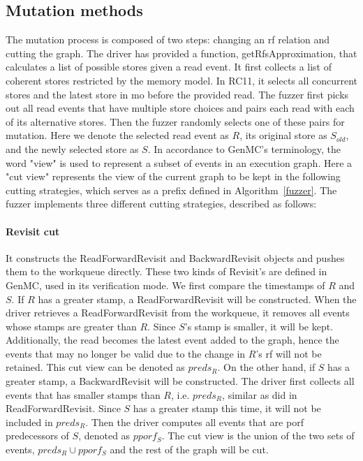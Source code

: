 \subsection{Mutation methods}

The mutation process is composed of two steps: changing an rf relation and cutting the graph. The driver has provided a function, getRfsApproximation, that calculates a list of possible stores given a read event. It first collects a list of coherent stores restricted by the memory model. In RC11, it selects all concurrent stores and the latest store in mo before the provided read. The fuzzer first picks out all read events that have multiple store choices and pairs each read with each of its alternative stores. Then the fuzzer randomly selects one of these pairs for mutation. Here we denote the selected read event as $R$, its original store as $S_{old}$, and the newly selected store as $S$. In accordance to GenMC's terminology, the word "view" is used to represent a subset of events in an execution graph. Here a "cut view" represents the view of the current graph to be kept in the following cutting strategies, which serves as a prefix defined in Algorithm~\ref{fuzzer}. The fuzzer implements three different cutting strategies, described as follows:

\paragraph{Revisit cut} It constructs the ReadForwardRevisit and BackwardRevisit objects and pushes them to the workqueue directly. These two kinds of Revisit's are defined in GenMC, used in its verification mode. We first compare the timestamps of $R$ and $S$. If $R$ has a greater stamp, a ReadForwardRevisit will be constructed. When the driver retrieves a ReadForwardRevisit from the workqueue, it removes all events whose stamps are greater than $R$. Since $S$'s stamp is smaller, it will be kept. Additionally, the read becomes the latest event added to the graph, hence the events that may no longer be valid due to the change in $R$'s rf will not be retained. This cut view can be denoted as $preds_{R}$. On the other hand, if $S$ has a greater stamp, a BackwardRevisit will be constructed. The driver first collects all events that has smaller stamps than $R$, i.e. $preds_{R}$, similar as did in ReadForwardRevisit. Since $S$ has a greater stamp this time, it will not be included in $preds_{R}$. Then the driver computes all events that are porf predecessors of $S$, denoted as $pporf_{S}$. The cut view is the union of the two sets of events, $preds_{R} \cup pporf_{S}$ and the rest of the graph will be cut.

